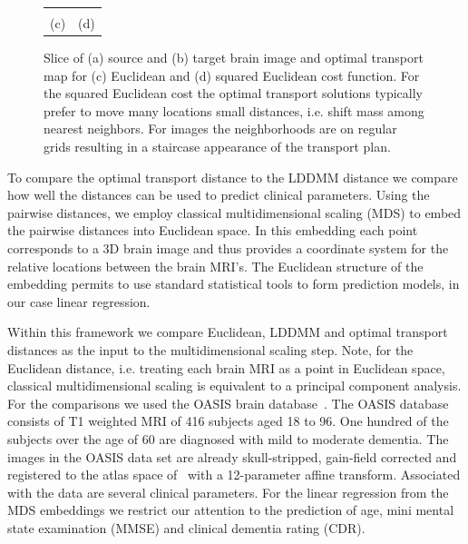 \documentclass[twoside,11pt]{article}
\begin{document}
\begin{figure}[bth]
\begin{tabular}{cc}
                       \vspace{-0.1in} \\
                   (c) & (d)
\end{tabular}
  \vspace{-0.1in}
\caption{
  \label{fig:brains}
 Slice of (a) source and (b) target brain image and optimal transport map for
 (c) Euclidean and (d) squared Euclidean cost function. For the squared
 Euclidean cost the optimal transport solutions typically prefer to move many
 locations small distances, i.e. shift mass among nearest neighbors. For images
 the neighborhoods are on regular grids resulting in a staircase appearance of
 the transport plan.  } 
 \end{figure}

To compare the optimal transport distance to the LDDMM distance we compare how
well the distances can be used to predict clinical parameters. Using the pairwise
distances, we employ classical multidimensional scaling (MDS) to embed the pairwise
distances into Euclidean space. In this embedding each point corresponds to a 3D
brain image and thus provides a coordinate system for the relative locations
between the brain MRI's. The Euclidean structure of the embedding permits to
use standard statistical tools to form prediction models, in our case linear
regression.

Within this framework we compare Euclidean, LDDMM and optimal transport
distances as the input to the multidimensional scaling step.  Note, for the
Euclidean distance, i.e. treating each brain MRI as a point in Euclidean space,
classical multidimensional scaling is equivalent to a principal component
analysis.  
For the comparisons we used the OASIS brain database~\citep{oasis-brains}.  The
OASIS database consists of T1 weighted MRI of 416 subjects aged 18 to 96. One
hundred of the subjects over the age of 60 are diagnosed with mild to moderate
dementia. The images in the OASIS data set are already skull-stripped,
gain-field corrected and registered to the atlas space
of~\citet{talaraich:book88} with a 12-parameter affine transform. Associated
with the data are several clinical parameters. For the linear regression from
the MDS embeddings we restrict our attention to the prediction of age, mini
mental state examination (MMSE) and clinical dementia rating (CDR).
\end{document}
